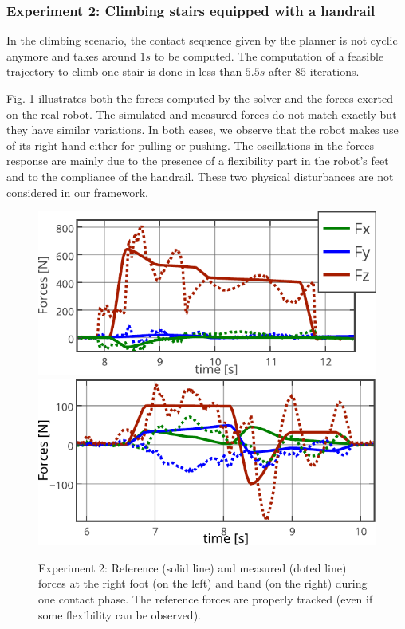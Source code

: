 \subsubsection*{Experiment 2: Climbing stairs equipped with a handrail}

In the climbing scenario, the contact sequence given by the planner is not cyclic anymore and takes around $1s$ to be computed. The computation of a feasible trajectory to climb one stair is done in less than $5.5s$ after $85$ iterations. 

Fig. \ref{fig:foot_forces} illustrates both the forces computed by the solver and the forces exerted on the real robot.
The simulated and measured forces do not match exactly but they have similar variations.
In both cases, we observe that the robot makes use of its right hand either for pulling or pushing.
The oscillations in the forces response are mainly due to the presence of a flexibility part in the robot's feet and to the compliance of the handrail.
These two physical disturbances are not considered in our framework.

\begin{figure}[!ht]
	\centering
	\includegraphics[width=0.4\linewidth]{./Multicontact/MulticontactJustin/fig/Right_Foot_Forces.pdf}
	\hspace*{1cm}
	\includegraphics[width=0.4\linewidth]{./Multicontact/MulticontactJustin/fig/Right_Hand_Forces.pdf}
		\caption{Experiment 2: Reference (solid line) and measured (doted line) forces at the right foot (on the left) and hand (on the right) during one contact phase. The reference forces are properly tracked (even if some flexibility can be observed).}
		\label{fig:foot_forces}
\end{figure}
